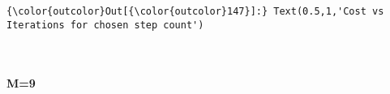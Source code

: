\documentclass[11pt]{article}
\begin{document}
\begin{Verbatim}[commandchars=\\\{\}]
{\color{outcolor}Out[{\color{outcolor}147}]:} Text(0.5,1,'Cost vs Iterations for chosen step count')
\end{Verbatim}
            
    \begin{center}
    \end{center}
    { \hspace*{\fill} \\}
    
    \paragraph{M=9}\label{m9}
\end{document}
